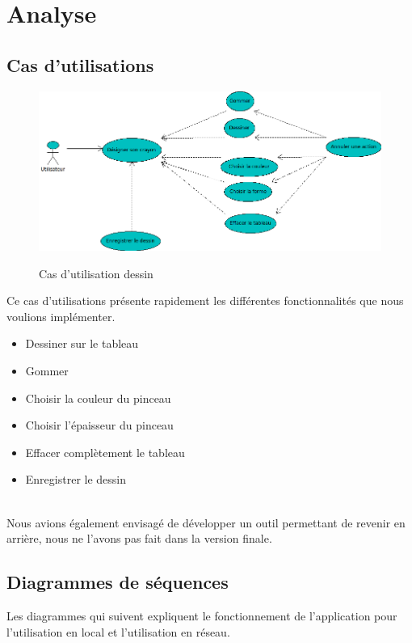 \documentclass{report}
\begin{document}
		\newpage
		\section{Analyse}
			\subsection{Cas d'utilisations}
				\begin{figure}[!h]
						\centering
						\includegraphics[scale=0.6]{../images/Dessin.png}\\
						\caption{Cas d'utilisation dessin}
						\label{Cas d'utilisation}
				\end{figure}
				
				Ce cas d'utilisations présente rapidement les différentes fonctionnalités que nous voulions implémenter.
				\begin{itemize}
				\item Dessiner sur le tableau
				\item Gommer
				\item Choisir la couleur du pinceau
				\item Choisir l'épaisseur du pinceau
				\item Effacer complètement le tableau
				\item Enregistrer le dessin
				\end{itemize}
				\ \\
				Nous avions également envisagé de développer un outil permettant de revenir en arrière, nous ne l'avons pas fait dans la version finale. \\
			\newpage
			\subsection{Diagrammes de séquences}
			Les diagrammes qui suivent expliquent le fonctionnement de l'application pour l'utilisation en local et l'utilisation en réseau.
\end{document}

